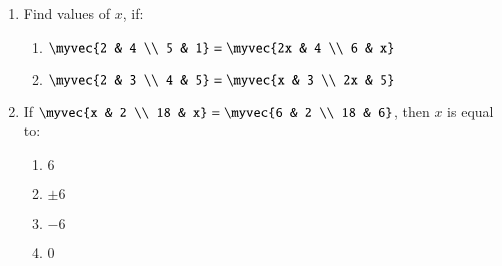 \documentclass{article}
\theoremstyle{remark}
\begin{document}
\begin{enumerate}
\item Find values of $x$, if:
\begin{enumerate}[label=(\roman*)]
\item $\myvec
{2 & 4 \\ 5 & 1}=\myvec {2x & 4 \\ 6 & x}$
\item $\myvec
{2 & 3 \\ 4 & 5}=\myvec  {x & 3 \\ 2x & 5}$
\end{enumerate}
\item If $\myvec
{x & 2 \\ 18 & x}=\myvec {6 & 2 \\ 18 & 6}$, then $x$ is equal to:
\begin{enumerate}
\item $6$
\item $\pm 6$
\item $-6$
\item $0$
\end{enumerate}
\end{enumerate}
\end{document}
